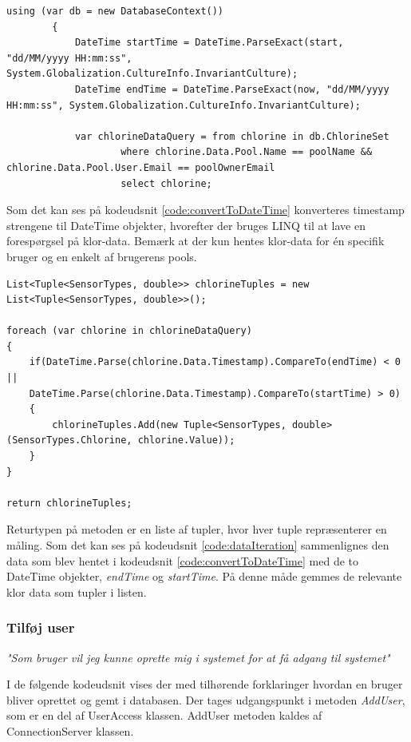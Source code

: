 \begin{lstlisting}[caption=Konvertering tilbage til DateTime objekter,label=code:convertToDateTime]
using (var db = new DatabaseContext())
		{   
			DateTime startTime = DateTime.ParseExact(start, "dd/MM/yyyy HH:mm:ss", System.Globalization.CultureInfo.InvariantCulture);
			DateTime endTime = DateTime.ParseExact(now, "dd/MM/yyyy HH:mm:ss", System.Globalization.CultureInfo.InvariantCulture);

			var chlorineDataQuery = from chlorine in db.ChlorineSet
					where chlorine.Data.Pool.Name == poolName && chlorine.Data.Pool.User.Email == poolOwnerEmail
					select chlorine;

\end{lstlisting}

Som det kan ses på kodeudsnit \ref{code:convertToDateTime} konverteres timestamp strengene til DateTime objekter, hvorefter der bruges LINQ til at lave en forespørgsel på klor-data. Bemærk at der kun hentes klor-data for én specifik bruger og en enkelt af brugerens pools.

\begin{lstlisting}[caption=Iteration over indhentet pool data,label=code:dataIteration]
List<Tuple<SensorTypes, double>> chlorineTuples = new List<Tuple<SensorTypes, double>>();

foreach (var chlorine in chlorineDataQuery)
{
	if(DateTime.Parse(chlorine.Data.Timestamp).CompareTo(endTime) < 0 ||
	DateTime.Parse(chlorine.Data.Timestamp).CompareTo(startTime) > 0)
	{
		chlorineTuples.Add(new Tuple<SensorTypes, double>(SensorTypes.Chlorine, chlorine.Value));
	}
}

return chlorineTuples;
\end{lstlisting}

Returtypen på metoden er en liste af tupler, hvor hver tuple repræsenterer en måling. Som det kan ses på kodeudsnit \ref{code:dataIteration} sammenlignes den data som blev hentet i kodeudsnit \ref{code:convertToDateTime} med de to DateTime objekter, \textit{endTime} og \textit{startTime}. På denne måde gemmes de relevante klor data som tupler i listen.

\subsubsection{Tilføj user}

\textit{"Som bruger vil jeg kunne oprette mig i systemet for at få adgang til systemet"}

I de følgende kodeudsnit vises der med tilhørende forklaringer hvordan en bruger bliver oprettet og gemt i databasen. Der tages udgangspunkt i metoden \textit{AddUser}, som er en del af UserAccess klassen. AddUser metoden kaldes af ConnectionServer klassen.
 
